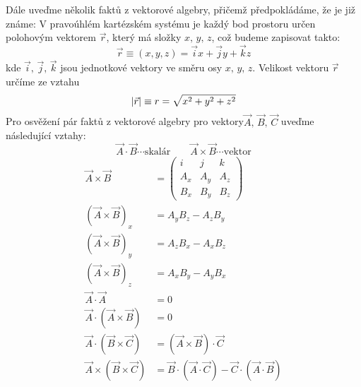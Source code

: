     Dále uveďme několik faktů z vektorové algebry, přičemž předpokládáme, že je již známe: V 
    pravoúhlém kartézském systému je každý bod prostoru určen polohovým vektorem $\vec{r}$, který 
    má složky $x,\,y,\,z$, což budeme zapisovat takto:
    \begin{equation}\label{fyz:eq688}
      \vec{r}\equiv(x,y,z)=\vec{i}x+\vec{j}y+\vec{k}z
    \end{equation}
    kde $\vec{i},\,\vec{j},\,\vec{k}$ jsou jednotkové vektory ve směru osy $x,\,y,\,z$. Velikost 
    vektoru $\vec{r}$ určíme ze vztahu
    \begin{equation}\label{fyz:eq689}
      \left\lvert\vec{r}\right\rvert\equiv r = \sqrt{x^2+y^2+z^2}
    \end{equation}
    Pro osvěžení pár faktů z vektorové algebry pro vektory$\vec{A},\,\vec{B},\,\vec{C}$ uveďme 
    následující vztahy: 
    \begin{equation*}
      \vec{A}\cdot \vec{B}\cdots\text{skalár} \quad\quad                        
      \vec{A}\times\vec{B}\cdots \mathrm{vektor}   
    \end{equation*}
    \begin{subequations}
      \begin{align}
        \vec{A}\times\vec{B}    
          &=  \left(
                \begin{array}{ccc}
                  i  &  j  &  k    \\
                  A_x & A_y & A_z  \\
                  B_x & B_y & B_z
                \end{array}
              \right)                                                                  \\
      (\vec{A}\times \vec{B})_x 
        &= A_yB_z-A_zB_y \label{fyz:eq690}                                   \nonumber \\
      (\vec{A}\times \vec{B})_y 
        &= A_zB_x-A_xB_z                                                     \nonumber \\
      (\vec{A}\times \vec{B})_z 
        &= A_xB_y-A_yB_x                                                     \nonumber \\
        \vec{A}\cdot  \vec{A}     
        &= 0                                                                           \\
        \vec{A}\cdot (\vec{A}\times\vec{B})   
        &= 0                                                                           \\          
        \vec{A}\cdot (\vec{B}\times\vec{C})  
        &= (\vec{A}\times \vec{B})\cdot\vec{C}                                         \\
        \vec{A}\times(\vec{B}\times\vec{C})  
        &= \vec{B}\cdot (\vec{A} \cdot\vec{C})
            -\vec{C}\cdot (\vec{A} \cdot\vec{B})              \label{fey:eq_baccab}          
      \end{align}
    \end{subequations}
